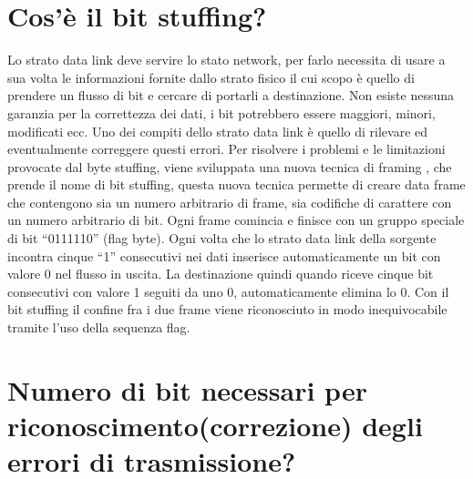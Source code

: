 \section{Cos’è il bit stuffing?}

Lo strato data link deve servire lo stato network, per farlo necessita di usare a sua volta le informazioni fornite dallo strato fisico il cui scopo è quello di prendere un flusso di bit e cercare di portarli a destinazione.
Non esiste nessuna garanzia per la correttezza dei dati, i bit potrebbero essere maggiori, minori, modificati ecc. Uno dei compiti dello strato data link è quello di rilevare ed eventualmente correggere questi errori.
Per risolvere i problemi e le limitazioni provocate dal byte stuffing, viene sviluppata una nuova tecnica di framing , che prende il nome di bit stuffing, questa nuova tecnica permette di creare data frame che contengono sia un numero arbitrario di frame, sia codifiche di carattere con un numero arbitrario di bit.
Ogni frame comincia e finisce con un gruppo speciale di bit “0111110” (flag byte). Ogni volta che lo strato data link della sorgente incontra cinque “1” consecutivi nei dati inserisce automaticamente un bit con valore 0 nel flusso in uscita. La destinazione quindi quando riceve cinque bit consecutivi con valore 1 seguiti da uno 0, automaticamente elimina lo 0.
Con il bit stuffing il confine fra i due frame viene riconosciuto in modo inequivocabile tramite l’uso della sequenza flag.
 

\section{Numero di bit necessari per riconoscimento(correzione) degli errori di trasmissione?}

